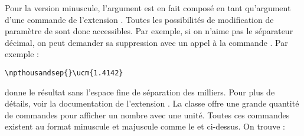 \documentclass[nocrop]{sesamanuel}
\begin{document}
Pour la version minuscule, l'argument est en fait composé en tant
qu'argument d'une commande  de l'extension
. Toutes les possibilités de modification de
paramètre de  sont donc accessibles. Par exemple, si
on n'aime pas le séparateur décimal, on peut demander sa suppression
avec un appel à la commande . Par exemple :
\begin{verbatim}
\npthousandsep{}\ucm{1.4142}
\end{verbatim}
donne le résultat
\begingroup
\npthousandsep{}
\endgroup
sans l'espace fine de séparation des milliers. Pour plus de détails,
voir la documentation de l'extension . La classe
offre une grande quantité de commandes pour afficher un nombre avec
une unité. Toutes ces commandes existent au format minuscule et
majuscule comme le  et  ci-dessus. On trouve :
\newcommand\uu[1]{%
  \cmd{u#1\{1234\}} &
  \csname u#1\endcsname{1234}
}
\newcommand\uutitre[1]{%
  \multicolumn{6}{|c|}{\bfseries #1} \\*\hline
}
\newcommand\uusoustitre[1]{%
  \multicolumn{6}{|c|}{\hrulefill{} #1 \hrulefill} \\*
}
\end{document}
